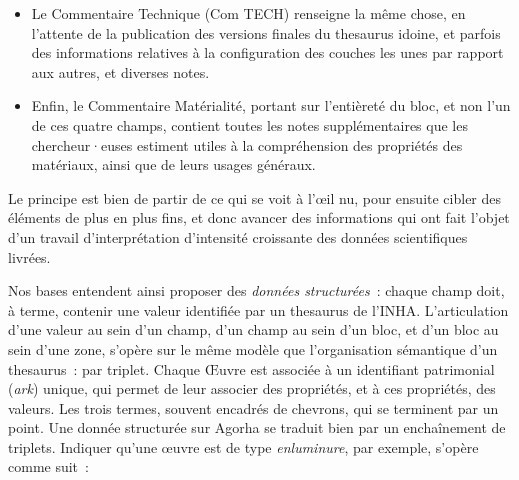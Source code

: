 \documentclass[a4paper,12pt, twoside]{book}
\begin{document}
\begin{itemize}
\item \textsf{Le Commentaire Technique} (Com TECH) renseigne la même chose, en l’attente de la publication des versions finales du thesaurus idoine, et parfois des informations relatives à la configuration des couches les unes par rapport aux autres, et diverses notes.\\

\item Enfin, le \textsf{Commentaire Matérialité}, portant sur l’entièreté du bloc, et non l’un de ces quatre champs, contient toutes les notes supplémentaires que les chercheur·euses estiment utiles à la compréhension des propriétés des matériaux, ainsi que de leurs usages généraux.
\end{itemize}

Le principe est bien de partir de ce qui se voit à l’œil nu, pour ensuite cibler des éléments de plus en plus fins, et donc avancer des informations qui ont fait l’objet d’un travail d’interprétation d’intensité croissante des données scientifiques livrées.

Nos bases entendent ainsi proposer des \textit{données structurées}~: chaque champ doit, à terme, contenir une valeur identifiée par un thesaurus de l’INHA. L’articulation d’une valeur au sein d’un champ, d’un champ au sein d’un bloc, et d’un bloc au sein d’une zone, s’opère sur le même modèle que l’organisation sémantique d’un thesaurus~: par triplet. Chaque \textsf{Œuvre} est associée à un identifiant patrimonial (\textit{ark}) unique, qui permet de leur associer des propriétés, et à ces propriétés, des valeurs. Les trois termes, souvent encadrés de chevrons, qui se terminent par un point. Une donnée structurée sur Agorha se traduit bien par un enchaînement de triplets. Indiquer qu’une œuvre est de type \textit{enluminure}, par exemple, s’opère comme suit~:
\end{document}
